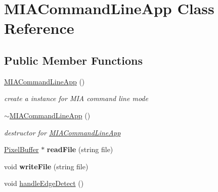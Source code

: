 \hypertarget{classMIACommandLineApp}{}\section{M\+I\+A\+Command\+Line\+App Class Reference}
\label{classMIACommandLineApp}
\subsection*{Public Member Functions}
\begin{DoxyCompactItemize}
\item 
\hyperlink{classMIACommandLineApp_ae8a15eb502355df4de7651c089d5612a}{M\+I\+A\+Command\+Line\+App} ()\hypertarget{classMIACommandLineApp_ae8a15eb502355df4de7651c089d5612a}{}\label{classMIACommandLineApp_ae8a15eb502355df4de7651c089d5612a}

\begin{DoxyCompactList}\small\item\em create a instance for M\+IA command line mode \end{DoxyCompactList}\item 
\hyperlink{classMIACommandLineApp_a17138fe6ccb4ae16c344585f9808c8a1}{$\sim$\+M\+I\+A\+Command\+Line\+App} ()\hypertarget{classMIACommandLineApp_a17138fe6ccb4ae16c344585f9808c8a1}{}\label{classMIACommandLineApp_a17138fe6ccb4ae16c344585f9808c8a1}

\begin{DoxyCompactList}\small\item\em destructor for \hyperlink{classMIACommandLineApp}{M\+I\+A\+Command\+Line\+App} \end{DoxyCompactList}\item 
\hyperlink{classPixelBuffer}{Pixel\+Buffer} $\ast$ {\bfseries read\+File} (string file)\hypertarget{classMIACommandLineApp_a769f7b7b3f3684686afb424c00db4ee4}{}\label{classMIACommandLineApp_a769f7b7b3f3684686afb424c00db4ee4}

\item 
void {\bfseries write\+File} (string file)\hypertarget{classMIACommandLineApp_a5c98945cdad816e6645dc09f1537fc9e}{}\label{classMIACommandLineApp_a5c98945cdad816e6645dc09f1537fc9e}

\item 
void \hyperlink{classMIACommandLineApp_ad7e4e22804b01321b8366627297d3915}{handle\+Edge\+Detect} ()\hypertarget{classMIACommandLineApp_ad7e4e22804b01321b8366627297d3915}{}\label{classMIACommandLineApp_ad7e4e22804b01321b8366627297d3915}


\end{DoxyCompactItemize}
